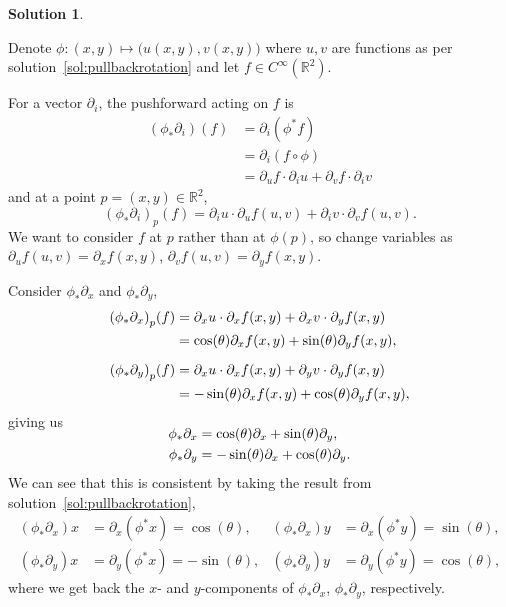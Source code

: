 \documentclass[11pt, a4paper]{report}
\theoremstyle{definition}
\newtheorem{solution}{Solution}[part]
\newenvironment{sol}{\begin{solution}}{\end{solution}\pagebreak[3]}
\begin{document}
\begin{sol}\label{sol:pushforwardrotation}

Denote $\phi: (x, y) \mapsto \bigl( u(x, y), v(x, y) \bigr)$ where $u, v$ are functions as per solution~\ref{sol:pullbackrotation} and let $f \in C^\infty(\mathbb{R}^2)$.

For a vector $\partial_i$, the pushforward acting on $f$ is
\begin{align*}
    (\phi_* \partial_i)(f) &= \partial_i (\phi^* f) \\
        &= \partial_i (f \circ \phi) \\
        &= \partial_u f \cdot \partial_i u + \partial_v f \cdot \partial_i v
\end{align*}
and at a point $p = (x, y) \in \mathbb{R}^2$,
\[
     {(\phi_* \partial_i)}_p(f) = \partial_i u \cdot \partial_u f(u, v) + \partial_i v \cdot \partial_v f(u, v).
\]
We want to consider $f$ at $p$ rather than at $\phi(p)$, so change variables as $\partial_u f(u, v) = \partial_x f(x, y)$, $\partial_v f(u, v) = \partial_y f(x, y)$.

Consider $\phi_* \partial_x$ and $\phi_* \partial_y$,
\begin{align*}
    {(\phi_* \partial_x)}_p(f) &= \partial_x u \cdot \partial_x f(x, y) + \partial_x v \cdot \partial_y f(x, y) \\
        &= \cos(\theta) \partial_x f(x, y) + \sin(\theta) \partial_y f(x, y), \\[2\jot]
    {(\phi_* \partial_y)}_p(f) &= \partial_x u \cdot \partial_x f(x, y) + \partial_y v \cdot \partial_y f(x, y) \\
        &= -\sin(\theta) \partial_x f(x, y) + \cos(\theta) \partial_y f(x, y),
\end{align*}
giving us
\begin{align*}
    \SwapAboveDisplaySkip
    \phi_* \partial_x &= \cos(\theta) \partial_x + \sin(\theta) \partial_y, \\
    \phi_* \partial_y &= -\sin(\theta) \partial_x + \cos(\theta) \partial_y.
\end{align*}
We can see that this is consistent by taking the result from solution~\ref{sol:pullbackrotation},
\begin{align*}
    (\phi_* \partial_x) x &= \partial_x(\phi^* x) = \cos(\theta), &
    (\phi_* \partial_x) y &= \partial_x(\phi^* y) = \sin(\theta), \\
    (\phi_* \partial_y) x &= \partial_y(\phi^* x) = -\sin(\theta), &
    (\phi_* \partial_y) y &= \partial_y(\phi^* y) = \cos(\theta),
\end{align*}
where we get back the $x$- and $y$-components of $\phi_* \partial_x$, $\phi_* \partial_y$, respectively.

\end{sol}
\end{document}
